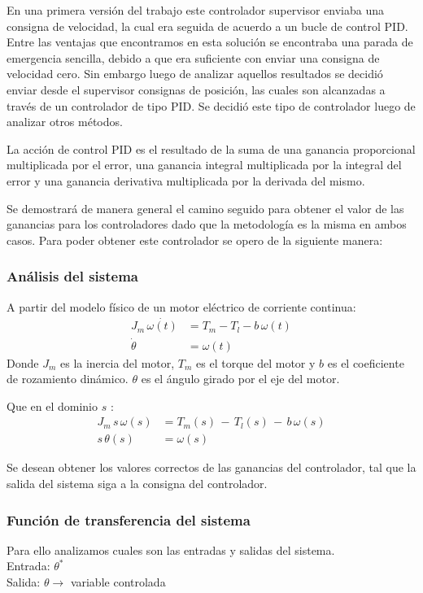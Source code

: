 \documentclass[journal]{IEEEtran}
\begin{document}
En una primera versión del trabajo este controlador supervisor enviaba una consigna de 
velocidad, la cual era seguida de acuerdo a un bucle de control PID. Entre las ventajas
que encontramos en esta solución se encontraba una parada de emergencia sencilla, debido
a que era suficiente con enviar una consigna de velocidad cero. Sin embargo luego
de analizar aquellos resultados se decidió enviar desde el supervisor consignas de 
posición, las cuales son alcanzadas a través de un controlador de tipo PID. 
Se decidió este tipo de controlador luego de analizar otros métodos.

La acción de control PID es el resultado de la suma de una ganancia proporcional multiplicada
por el error, una ganancia integral multiplicada por la integral del error y una ganancia
derivativa multiplicada por la derivada del mismo.

Se demostrará de manera general el camino seguido para obtener el valor de las ganancias para 
los controladores dado que la metodología es la misma en ambos casos. Para poder obtener este
controlador se opero de la siguiente manera:

\subsubsection{Análisis del sistema}
A partir del modelo físico de un motor eléctrico de corriente continua:
\begin{align}
  J_m \, \dot{\omega (t)} &= T_m - T_l - b \,{\omega}(t)\\
  \dot{\theta} &={\omega} (t)
\end{align}
Donde $J_m$ es la inercia del motor, $T_m$ es el torque del motor y $b$ es
el coeficiente de rozamiento dinámico. $\theta$ es el ángulo girado por el 
eje del motor.

Que en el dominio $s$ :
\begin{align}
  J_m \, s \, \omega (s) &= T_m (s) \,- \, T_l(s) \, -\,b\,\omega(s)\\
  s \, \theta (s) &= \omega (s)
\end{align}

Se desean obtener los valores correctos de las ganancias
del controlador, tal que la salida del sistema siga a la 
consigna del controlador.

\subsubsection{Función de transferencia del sistema}
Para ello analizamos cuales son las entradas y salidas del sistema.\\
Entrada: $\theta^*$ \\
Salida: $\theta \rightarrow$  variable controlada\\
\end{document}
